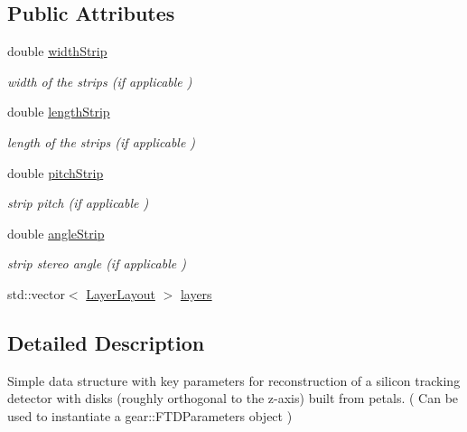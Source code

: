 \subsection*{Public Attributes}
\begin{DoxyCompactItemize}
\item 
double \hyperlink{struct_d_d4hep_1_1_d_d_rec_1_1_z_disk_petals_struct_a69d3bba6e63772378c1ceb4367a09bcd}{width\+Strip}
\begin{DoxyCompactList}\small\item\em width of the strips (if applicable ) \end{DoxyCompactList}\item 
double \hyperlink{struct_d_d4hep_1_1_d_d_rec_1_1_z_disk_petals_struct_a8319b709fefd285ffe4b3c09461d9990}{length\+Strip}
\begin{DoxyCompactList}\small\item\em length of the strips (if applicable ) \end{DoxyCompactList}\item 
double \hyperlink{struct_d_d4hep_1_1_d_d_rec_1_1_z_disk_petals_struct_a73e6274d9327c8e5aa26575ee6679dee}{pitch\+Strip}
\begin{DoxyCompactList}\small\item\em strip pitch (if applicable ) \end{DoxyCompactList}\item 
double \hyperlink{struct_d_d4hep_1_1_d_d_rec_1_1_z_disk_petals_struct_a2eb7ad29999d7e75fa4f2be841aed57d}{angle\+Strip}
\begin{DoxyCompactList}\small\item\em strip stereo angle (if applicable ) \end{DoxyCompactList}\item 
std\+::vector$<$ \hyperlink{struct_d_d4hep_1_1_d_d_rec_1_1_z_disk_petals_struct_1_1_layer_layout}{Layer\+Layout} $>$ \hyperlink{struct_d_d4hep_1_1_d_d_rec_1_1_z_disk_petals_struct_a815951a6a89fafccaa6124372f43b4e2}{layers}
\end{DoxyCompactItemize}


\subsection{Detailed Description}
Simple data structure with key parameters for reconstruction of a silicon tracking detector with disks (roughly orthogonal to the z-\/axis) built from petals. ( Can be used to instantiate a gear\+::\+F\+T\+D\+Parameters object )

